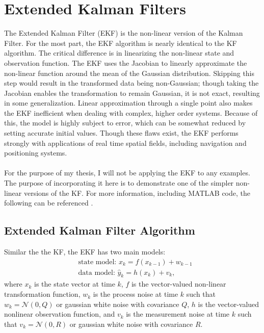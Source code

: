 \chapter{Extended Kalman Filters}
\label{Extended Kalman Filters}

The Extended Kalman Filter (EKF) is the non-linear version of the Kalman Filter. For the most part, the EKF algorithm is nearly identical to the KF algorithm. The critical difference is in linearizing the non-linear state and observation function. The EKF uses the Jacobian to linearly approximate the non-linear function around the mean of the Gaussian distribution. Skipping this step would result in the transformed data being non-Gaussian; though taking the Jacobian enables the transformation to remain Gaussian, it is not exact, resulting in some generalization. Linear approximation through a single point also makes the EKF inefficient when dealing with complex, higher order systems. Because of this, the model is highly subject to error, which can be somewhat reduced by setting accurate initial values. Though these flaws exist, the EKF performs strongly with applications of real time spatial fields, including navigation and positioning systems.  \\ \\
For the purpose of my thesis, I will not be applying the EKF to any examples. The purpose of incorporating it here is to demonstrate one of the simpler non-linear versions of the KF. For more information, including MATLAB code, the following can be referenced \cite{cao_2008, article7}.

\section{Extended Kalman Filter Algorithm}
Similar the the KF, the EKF has two main models:
\begin{align*}
&\text{state model: }  x_{k} = f( x_{k-1}) + w_{k-1}\\
&\text{data model: }  \hat y_k = h( x_k) + v_k,
\end{align*}
where $x_k$ is the state vector at time $k$, $f$ is the vector-valued non-linear transformation function, $w_k$ is the process noise at time $k$ such that $w_k = \mathcal{N}(0, Q)$ or  gaussian white noise with covariance $Q$, $h$ is the vector-valued nonlinear observation function, and $v_k$ is the measurement noise at time $k$ such that $v_k = \mathcal{N}(0, R)$ or gaussian white noise with covariance $R$. \\

